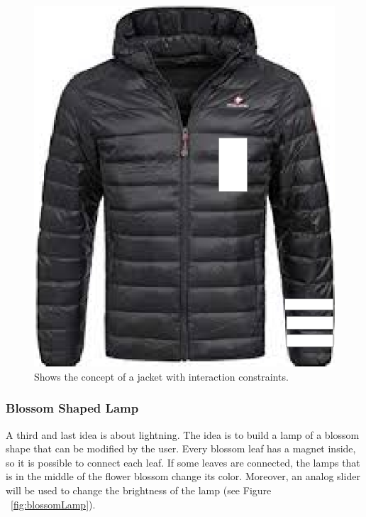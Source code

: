 \documentclass[04_projectProcess.tex]{subfiles}
\begin{document}
    \begin{figure}[h!]
        \centering
        \includegraphics[scale=0.2]{images/projectideas/jacket.png}
        \caption{Shows the concept of a jacket with interaction constraints.}
        \label{fig:jacketIdea}
    \end{figure}

    \subsubsection{Blossom Shaped Lamp}
    \label{BlossomShapedLamp}
    \begin{flushleft}
        A third and last idea is about lightning. The idea is to build a lamp of a blossom shape that 
        can be modified by the user. Every blossom leaf has a magnet inside, so it is possible to connect 
        each leaf. If some leaves are connected, the lamps that is in the middle of the flower blossom 
        change its color. Moreover, an analog slider will be used to change the brightness of the lamp 
        (see Figure ~\ref{fig:blossomLamp}).
    \end{flushleft}
\end{document}
